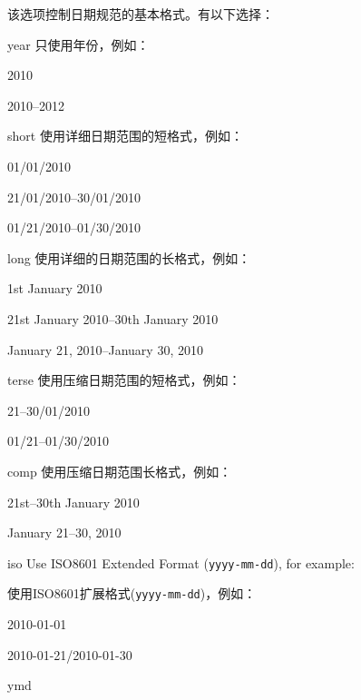 \begin{optionlist}


该选项控制日期规范的基本格式。有以下选择：

\begin{valuelist}
\item[year] %
只使用年份，例如：\par
2010\par
2010--2012\par
\item[short] %
使用详细日期范围的短格式，例如：\par
01/01/2010\par
21/01/2010--30/01/2010\par
01/21/2010--01/30/2010
\item[long] %
使用详细的日期范围的长格式，例如：\par
1st January 2010\par
21st January 2010--30th January 2010\par
January 21, 2010--January 30, 2010\par
\item[terse] %
使用压缩日期范围的短格式，例如：\par
21--30/01/2010\par
01/21--01/30/2010
\item[comp] %
使用压缩日期范围长格式，例如：\par
21st--30th January 2010\par
January 21--30, 2010\par
\item[iso] Use ISO8601 Extended Format (\texttt{yyyy-mm-dd}), for example:\par
使用ISO8601扩展格式(\texttt{yyyy-mm-dd})，例如：\par
2010-01-01\par
2010-01-21/2010-01-30
\item[ymd] %

\end{valuelist}
\end{optionlist}
